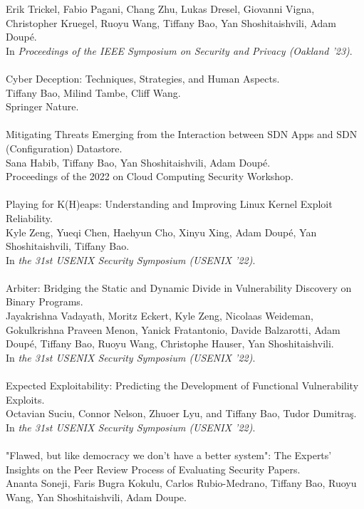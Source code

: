 \documentclass[11pt]{article}
\begin{document}
Erik Trickel, Fabio Pagani, Chang Zhu, Lukas Dresel, Giovanni Vigna, Christopher Kruegel, Ruoyu Wang, Tiffany Bao, Yan Shoshitaishvili, Adam Doup\'{e}. \\
In \emph{Proceedings of the IEEE Symposium on Security and Privacy (Oakland '23)}.
\\\\
Cyber Deception: Techniques, Strategies, and Human Aspects.\\
Tiffany Bao, Milind Tambe, Cliff Wang.\\
Springer Nature.
\\\\
Mitigating Threats Emerging from the Interaction between SDN Apps and SDN (Configuration) Datastore. \\
Sana Habib, Tiffany Bao, Yan Shoshitaishvili, Adam Doup\'{e}. \\
Proceedings of the 2022 on Cloud Computing Security Workshop.
\\\\
Playing for K(H)eaps: Understanding and Improving Linux Kernel Exploit Reliability. \\
Kyle Zeng, Yueqi Chen, Haehyun Cho, Xinyu Xing, Adam Doupé, Yan Shoshitaishvili, Tiffany Bao. \\
In \emph{the 31st USENIX Security Symposium (USENIX '22)}.
\\\\
Arbiter: Bridging the Static and Dynamic Divide in Vulnerability Discovery on Binary Programs. \\
Jayakrishna Vadayath, Moritz Eckert, Kyle Zeng, Nicolaas Weideman, Gokulkrishna Praveen Menon, Yanick Fratantonio, Davide Balzarotti, Adam Doupé, Tiffany Bao, Ruoyu Wang, Christophe Hauser, Yan Shoshitaishvili. \\
In \emph{the 31st USENIX Security Symposium (USENIX '22)}.
\\\\
Expected Exploitability: Predicting the Development of Functional Vulnerability Exploits. \\
Octavian Suciu, Connor Nelson, Zhuoer Lyu, and Tiffany Bao, Tudor Dumitra\c{s}. \\
In \emph{the 31st USENIX Security Symposium (USENIX '22)}.
\\\\
"Flawed, but like democracy we don't have a better system": The Experts' Insights on the Peer Review Process of Evaluating Security Papers. \\
Ananta Soneji, Faris Bugra Kokulu, Carlos Rubio-Medrano, Tiffany Bao, Ruoyu Wang, Yan Shoshitaishvili, Adam Doupe.\\
\end{document}
